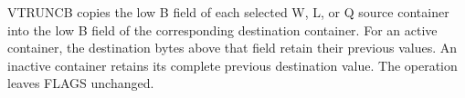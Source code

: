 VTRUNCB copies the low B field of each selected W, L, or Q source container into
the low B field of the corresponding destination container.  For an active
container, the destination bytes above that field retain their previous values.
An inactive container retains its complete previous destination value.  The
operation leaves FLAGS unchanged.
